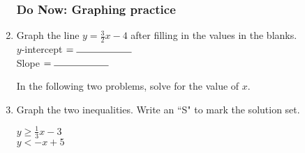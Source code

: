 \documentclass[12pt, oneside]{article}
\begin{document}
  \begin{enumerate}
    \subsubsection*{Do Now: Graphing practice}

        \item Graph the line $y=\frac{3}{2} x -4$ after filling in the values in the blanks.\\[0.85cm]
              $y$-intercept $= \rule{2cm}{0.15mm}$ \\[0.5cm]
              Slope $= \rule{2cm}{0.15mm}$\\

        \begin{center} %
        \end{center}

        In the following two problems, solve for the value of $x$.

\newpage
\item Graph the two inequalities. Write an ``S" to mark the solution set.\\[0.5cm]

  \begin{multicols}{2}
    $y \geq \frac{1}{3} x -3$ \\
    $y < -x +5$
  \end{multicols}
  \begin{center} %
  \end{center}


\end{enumerate}
\end{document}
